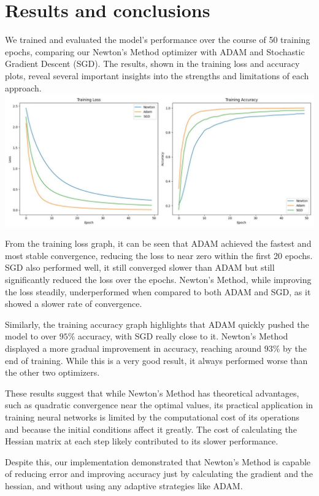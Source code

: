 \documentclass[10pt]{article}
\begin{document}
\section*{Results and conclusions}
We trained and evaluated the model's performance over the course of 50 training epochs, comparing our Newton's Method optimizer with ADAM and Stochastic Gradient Descent (SGD). The results, shown in the training loss and accuracy plots, reveal several important insights into the strengths and limitations of each approach.\\
\includegraphics[max width=\textwidth, center]{2025_04_08_c5129b05008e68f8b3cdg-2}

From the training loss graph, it can be seen that ADAM achieved the fastest and most stable convergence, reducing the loss to near zero within the first 20 epochs. SGD also performed well, it still converged slower than ADAM but still significantly reduced the loss over the epochs. Newton's Method, while improving the loss steadily, underperformed when compared to both ADAM and SGD, as it showed a slower rate of convergence.

Similarly, the training accuracy graph highlights that ADAM quickly pushed the model to over $95 \%$ accuracy, with SGD really close to it. Newton's Method displayed a more gradual improvement in accuracy, reaching around $93 \%$ by the end of training. While this is a very good result, it always performed worse than the other two optimizers.

These results suggest that while Newton's Method has theoretical advantages, such as quadratic convergence near the optimal values, its practical application in training neural networks is limited by the computational cost of its operations and because the initial conditions affect it greatly. The cost of calculating the Hessian matrix at each step likely contributed to its slower performance.

Despite this, our implementation demonstrated that Newton's Method is capable of reducing error and improving accuracy just by calculating the gradient and the hessian, and without using any adaptive strategies like ADAM.
\end{document}
